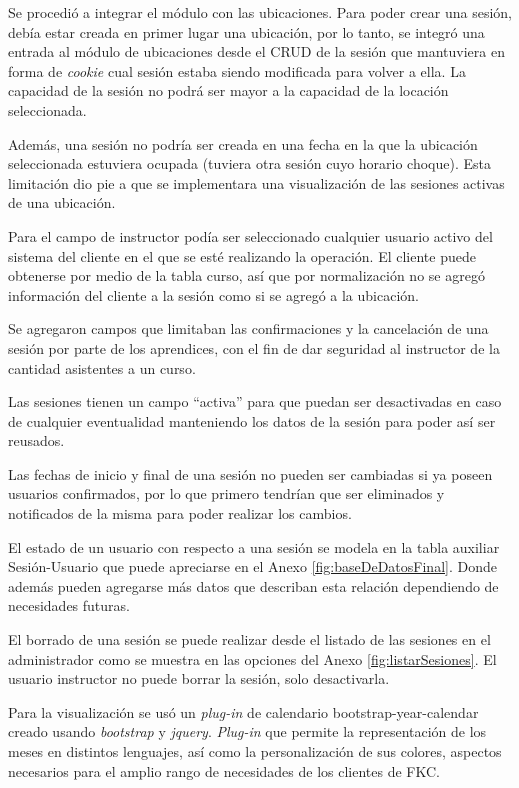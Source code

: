 	Se procedió a integrar el módulo con las ubicaciones. Para poder crear una sesión, debía estar creada en primer lugar una ubicación, por lo tanto, se integró una entrada al módulo de ubicaciones desde el \gls{CRUD} de la sesión que mantuviera en forma de \emph{cookie} cual sesión estaba siendo modificada para volver a ella. La capacidad de la sesión no podrá ser mayor a la capacidad de la locación seleccionada.

	Además, una sesión no podría ser creada en una fecha en la que la ubicación seleccionada estuviera ocupada (tuviera otra sesión cuyo horario choque). Esta limitación dio pie a que se implementara una visualización de las sesiones activas de una ubicación.

	Para el campo de instructor podía ser seleccionado cualquier usuario activo del sistema del cliente en el que se esté realizando la operación. El cliente puede obtenerse por medio de la tabla curso, así que por normalización no se agregó información del cliente a la sesión como si se agregó a la ubicación.

	Se agregaron campos que limitaban las confirmaciones y la cancelación de una sesión por parte de los aprendices, con el fin de dar seguridad al instructor de la cantidad asistentes a un curso.

	Las sesiones tienen un campo ``activa'' para que puedan ser desactivadas en caso de cualquier eventualidad manteniendo los datos de la sesión para poder así ser reusados.

	Las fechas de inicio y final de una sesión no pueden ser cambiadas si ya poseen usuarios confirmados, por lo que primero tendrían que ser eliminados y notificados de la misma para poder realizar los cambios.

	El estado de un usuario con respecto a una sesión se modela en la tabla auxiliar Sesión-Usuario que puede apreciarse en el Anexo \ref{fig:baseDeDatosFinal}. Donde además pueden agregarse más datos que describan esta relación dependiendo de necesidades futuras.

	El borrado de una sesión se puede realizar desde el listado de las sesiones en el administrador como se muestra en las opciones del Anexo \ref{fig:listarSesiones}. El usuario instructor no puede borrar la sesión, solo desactivarla.

	Para la visualización se usó un \emph{plug-in} de calendario bootstrap-year-calendar creado usando \emph{bootstrap} y \emph{jquery}. \emph{Plug-in} que permite la representación de los meses en distintos lenguajes, así como la personalización de sus colores, aspectos necesarios para el amplio rango de necesidades de los clientes de FKC.

